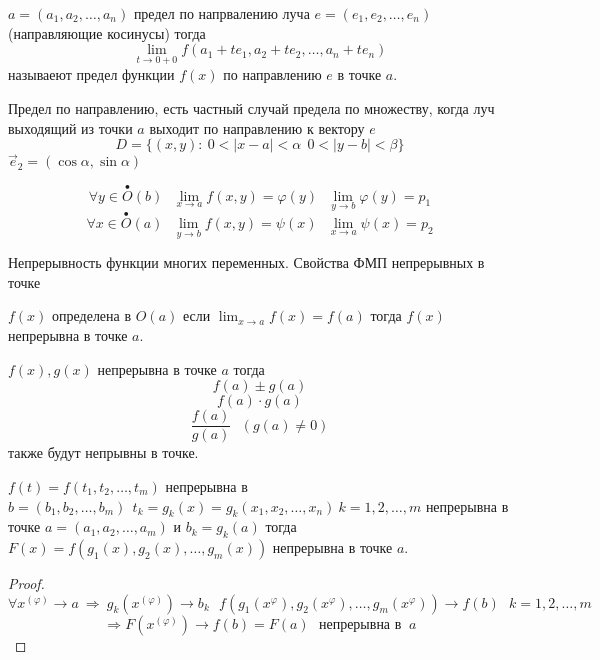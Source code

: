 \begin{define}
  $a = (a_1, a_2, \ldots, a_n)$ предел по
  напрвалению луча $e = (e_1, e_2, \ldots, e_n)$ (направляющие косинусы) тогда
  $$
  \lim_{t \to 0 +0} f(a_1 + te_1, a_2 + te_2, \ldots, a_n + te_n)
  $$
  называеют предел функции $f(x)$ по направлению $e$ в точке $a$.

  Предел по направлению, есть частный случай предела по множеству, когда луч
  выходящий из точки $a$ выходит по направлению к вектору $e$
  $$
  D = \{ (x,y): ~ 0 < |x - a| < \alpha ~~ 0 < |y - b| < \beta \}
  $$
  $\vec e_2 = (\cos \alpha, \sin \alpha)$
\end{define}

\begin{define}
  $$
  \forall y \in \stackrel{\bullet}{O}(b) ~~~
  \lim_{x \to a} f(x, y) = \varphi(y) ~~~ \lim_{y \to b} \varphi(y) = p_1
  $$
  $$
  \forall x \in \stackrel{\bullet}{O}(a) ~~~
  \lim_{y \to b} f(x, y) = \psi(x) ~~~ \lim_{x \to a} \psi(x) = p_2
  $$
\end{define}

\begin{title}[\Large]
  Непрерывность функции многих переменных. Свойства ФМП непрерывных в точке
\end{title}

\begin{define}
  $f(x)$ определена в $O(a)$ если $\lim_{x \to a} f(x) = f(a)$ тогда
  $f(x)$ непрерывна в точке $a$.
\end{define}

\begin{block}[Свойства]
  $f(x), g(x)$ непрерывна в точке $a$ тогда
  $$
  f(a) \pm g(a)
  $$
  $$
  f(a) \cdot g(a)
  $$
  $$
  \frac{f(a)}{g(a)} ~~~ (g(a) \not= 0)
  $$
  также будут непрывны в точке.
\end{block}

\begin{theorem}
  $f(t) = f(t_1, t_2, \ldots, t_m)$ непрерывна в $b = (b_1, b_2, \ldots, b_m)
  ~~ t_k = g_k(x) = g_k(x_1, x_2, \ldots, x_n) ~ k = 1,2, \ldots, m$
  непрерывна в точке $a = (a_1, a_2, \ldots, a_m)$ и $b_k = g_k(a)$ тогда
  $F(x) = f(g_1(x), g_2(x), \ldots, g_m(x))$ непрерывна в точке $a$.
\end{theorem}

\begin{proof}
  $$
  \forall x^{(\varphi)} \to a ~ \Rightarrow ~ g_k(x^{(\varphi)}) \to b_k ~~~
  f(g_1(x^{\varphi}), g_2(x^{\varphi}), \ldots, g_m(x^{\varphi})) \to f(b) ~~~
  k = 1,2, \ldots, m
  $$
  $$
  \Rightarrow F(x^{(\varphi)}) \to f(b) = F(a) ~~~ \text{непрерывна в } ~ a
  $$
\end{proof}


